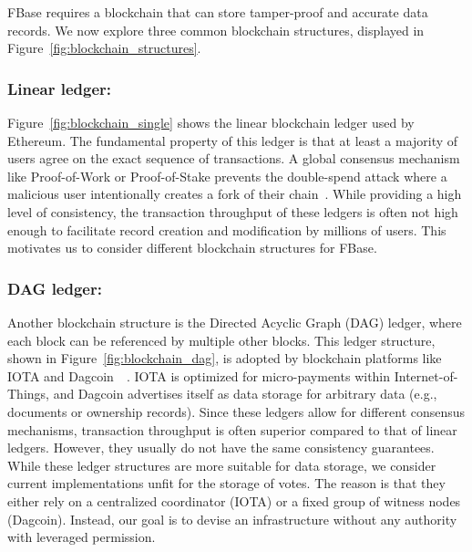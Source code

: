 FBase requires a blockchain that can store tamper-proof and accurate data records.
We now explore three common blockchain structures, displayed in Figure~\ref{fig:blockchain_structures}.

\subsubsection{\textbf{Linear ledger:}} 
Figure~\ref{fig:blockchain_single} shows the linear blockchain ledger used by Ethereum.
The fundamental property of this ledger is that at least a majority of users agree on the exact sequence of transactions.
A global consensus mechanism like Proof-of-Work or Proof-of-Stake prevents the double-spend attack where a malicious user intentionally creates a fork of their chain~\cite{vukolic2015quest}.
While providing a high level of consistency, the transaction throughput of these ledgers is often not high enough to facilitate record creation and modification by millions of users.
This motivates us to consider different blockchain structures for FBase.

\subsubsection{\textbf{DAG ledger:}} 
Another blockchain structure is the Directed Acyclic Graph (DAG) ledger, where each block can be referenced by multiple other blocks.
This ledger structure, shown in Figure~\ref{fig:blockchain_dag}, is adopted by blockchain platforms like IOTA and Dagcoin~\cite{popov2018tangle}~\cite{lerner2015dagcoin}.
IOTA is optimized for micro-payments within Internet-of-Things, and Dagcoin advertises itself as data storage for arbitrary data (e.g., documents or ownership records).
Since these ledgers allow for different consensus mechanisms, transaction throughput is often superior compared to that of linear ledgers.
However, they usually do not have the same consistency guarantees.
While these ledger structures are more suitable for data storage, we consider current implementations unfit for the storage of votes.
The reason is that they either rely on a centralized coordinator (IOTA) or a fixed group of witness nodes (Dagcoin).
Instead, our goal is to devise an infrastructure without any authority with leveraged permission.

